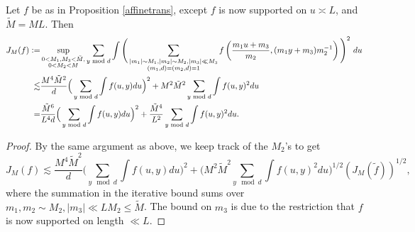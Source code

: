 \begin{corollary}\label{cor: affine}
    Let $f$ be as in Proposition \ref{affinetrans}, except $f$ is now supported on $u \asymp L$, and $\tilde{M}={ML}$. Then \begin{align*}
        J_{M}(f)\mathrel{\mathop:}= &\sup_{\substack{0<M_1,M_3<\tilde{M}, \\ 0< M_2<{M}}}\sum_{y \textrm{ mod } d} \int\Bigg( \sum_{\substack{|m_1|\sim M_1,|m_2|\sim M_2 , |m_3|\ll M_3\\ (m_1,d)=(m_2,d)=1}} f\left(\frac{m_1 u+m_3}{m_2},(m_1 y+m_3)m_2^{-1}\right)\Bigg)^2 \ du\\
        \lesssim&\frac{M^4\tilde{M}^2}{d}\Big(\sum_{y \textrm{ mod } d } \int f(u,y) du\Big)^2  + {M}^2\tilde{M}^2\sum_{y\textrm{ mod } d} \int f(u,y)^2 du\\
        =&\frac{\tilde{M}^6}{L^4d}\Big(\sum_{y \textrm{ mod } d } \int f(u,y) du\Big)^2  + \frac{\tilde{M}^4}{L^2}\sum_{y\textrm{ mod } d} \int f(u,y)^2 du
        .
    \end{align*}
\end{corollary}
\begin{proof}
    By the same argument as above, we keep track of the $M_2$'s to get 
    \[
        J_{{M}}(f) \lesssim \frac{M^4\tilde{M}^2}{d} \Big(\sum_{y \mod d } \int f(u,y) du\Big)^2 + \Big(M^2\tilde{M}^2\sum_{y\mod d} \int f(u,y)^2 du\Big)^{1/2}(J_{M}(\tilde{f}))^{1/2},
    \] where the summation in the iterative bound sums over $m_1,m_2\sim M_2, |m_3| \ll LM_2\leq \tilde{M}$. The bound on $m_3$ is due to the restriction that $f$ is now supported on length $\ll L$.
\end{proof}
